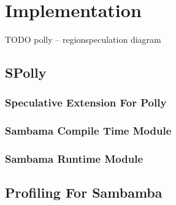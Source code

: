 
\chapter{Implementation} %
\label{Chapter3}

\begin{center}
  TODO polly -- regionspeculation diagram
\end{center}


\section{SPolly}

\subsection{Speculative Extension For Polly}

\subsection{Sambama Compile Time Module}

\subsection{Sambama Runtime Module}

\section{Profiling For Sambamba}
